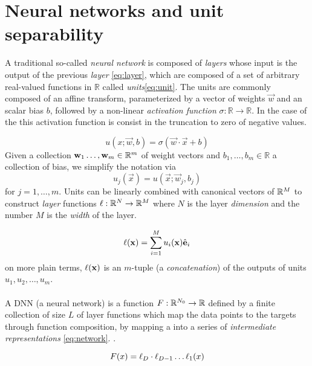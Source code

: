 \section{Neural networks and unit separability}

A traditional so-called \emph{neural network} is composed of \emph{layers} whose input is the output of the previous \emph{layer} \ref{eq:layer}, which are composed of a set of arbitrary real-valued functions in $\mathbb{R}$ called \emph{units}\ref{eq:unit}. The units are commonly composed of an affine transform, parameterized by a vector of weights $\vec{w}$ and an scalar bias $b$, followed by a non-linear \emph{activation function} $\sigma : \mathbb{R}\rightarrow\mathbb{R}$. In the case of the \ReLU this activation function is consist in the truncation to zero of negative values.

\begin{equation}\label{eq:unit}
u(x; \vec{w}, b) = \sigma(\vec{w} \cdot \vec{x} + b)
\end{equation}
Given a collection $\mathbf{w}_1\ldots,\mathbf{w}_m\in\mathbb{R}^{m}$ of weight vectors and $b_1,\ldots,b_m\in\mathbb{R}$ a collection of bias, we simplify the notation via
\begin{equation}
    u_j(\vec{x}) = u(\vec{x};\vec{w}_j,b_j)
\end{equation}
for $j=1,\ldots,m$. Units can be linearly combined with canonical vectors of $\mathbb{R}^{M}$ to construct \emph{layer} functions $\ell:\mathbb{R}^{N}\rightarrow\mathbb{R}^{M}$ where $N$ is the layer \emph{dimension} and the number $M$ is the \emph{width} of the layer.

\begin{equation}\label{eq:layer}
\ell(\mathbf{x}) = \sum^M_{i=1} u_i(\mathbf{x}) \hat{\textbf{e}}_i
\end{equation}
on more plain terms, $\ell(\mathbf{x})$ is an $m$-tuple (a \emph{concatenation}) of the outputs of units $u_1,u_2,\ldots,u_m$.
\\\\
A DNN (a neural network) is a function $F:\mathbb{R}^{N_0}\rightarrow\mathbb{R}$ defined by a finite collection of size $L$ of layer functions which map the data points to the targets through function composition, by mapping a into a series of \emph{intermediate representations} \ref{eq:network}. \cite{ramachandranEtAl2017SearchingForActivationFunctions,eswaranSingh2015SomeTheoremsForFFNN}.

\begin{equation}\label{eq:network}
F(x) = \ell_D \cdot \ell_{D-1} \dots \ell_1(x) 
\end{equation}

